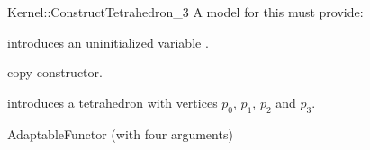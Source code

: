 \begin{ccRefFunctionObjectConcept}{Kernel::ConstructTetrahedron_3}
A model for this must provide:



\ccHidden {}
             {introduces an uninitialized variable .}

\ccHidden {}
            {copy constructor.}


            {introduces a tetrahedron  with vertices $p_0$, $p_1$, $p_2$ and $p_3$.}

\ccRefines
AdaptableFunctor (with four arguments)

\ccSeeAlso
{} \\

\end{ccRefFunctionObjectConcept}
